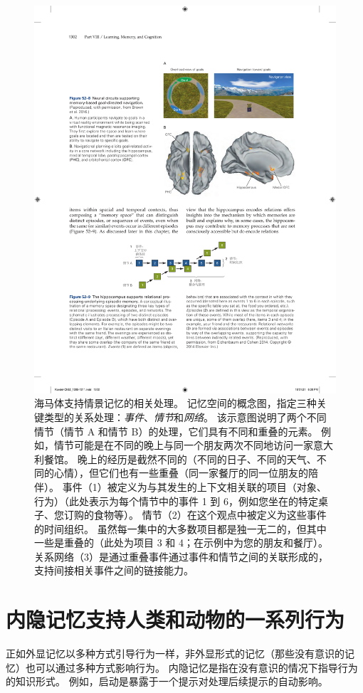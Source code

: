 \begin{figure}[htbp]
	\centering
	\includegraphics[width=0.77\linewidth]{chap52/fig_52_9}
	\caption{海马体支持情景记忆的相关处理。
		记忆空间的概念图，指定三种关键类型的关系处理：\textit{事件}、\textit{情节}和\textit{网络}。
		该示意图说明了两个不同情节（情节 A 和情节 B）的处理，它们具有不同和重叠的元素。
		例如，情节可能是在不同的晚上与同一个朋友两次不同地访问一家意大利餐馆。
		晚上的经历是截然不同的（不同的日子、不同的天气、不同的心情），但它们也有一些重叠（同一家餐厅的同一位朋友的陪伴）。
		事件（1）被定义为与其发生的上下文相关联的项目（对象、行为）（此处表示为每个情节中的事件 1 到 6，例如您坐在的特定桌子、您订购的食物等）。
		情节（2）在这个观点中被定义为这些事件的时间组织。 虽然每一集中的大多数项目都是独一无二的，但其中一些是重叠的（此处为项目 3 和 4；在示例中为您的朋友和餐厅）。
		关系网络（3）是通过重叠事件通过事件和情节之间的关联形成的，支持间接相关事件之间的链接能力\cite{eichenbaum2014can}。 }
	\label{fig:52_9}
\end{figure}



\section{内隐记忆支持人类和动物的一系列行为}

正如外显记忆以多种方式引导行为一样，非外显形式的记忆（那些没有意识的记忆）也可以通过多种方式影响行为。
内隐记忆是指在没有意识的情况下指导行为的知识形式。
例如，启动是暴露于一个提示对处理后续提示的自动影响。


